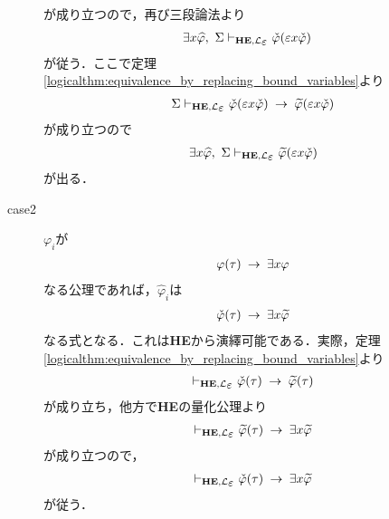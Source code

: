 \begin{metaprf}
\begin{description}
				が成り立つので，再び三段論法より
				\begin{align}
					\exists x \widehat{\varphi},\ \Sigma &\provable{\mbox{{\bf HE}},\lang{\varepsilon}} \check{\varphi}(\varepsilon x \check{\varphi})
				\end{align}
				が従う．ここで定理\ref{logicalthm:equivalence_by_replacing_bound_variables}より
				\begin{align}
					\Sigma \provable{\mbox{{\bf HE}},\lang{\varepsilon}} \check{\varphi}(\varepsilon x \check{\varphi}) \rarrow  \widetilde{\varphi}(\varepsilon x \check{\varphi})
				\end{align}
				が成り立つので
				\begin{align}
					\exists x \widehat{\varphi},\ \Sigma \provable{\mbox{{\bf HE}},\lang{\varepsilon}} \widetilde{\varphi}(\varepsilon x \check{\varphi})
				\end{align}
				が出る．
				
			\item[case2] $\varphi_{i}$が
				\begin{align}
					\varphi(\tau) \hspace{0.25em}\rightarrow\hspace{0.25em} \exists x \varphi
				\end{align}
				なる公理であれば，$\widehat{\varphi}_{i}$は
				\begin{align}
					\check{\varphi}(\tau) \hspace{0.25em}\rightarrow\hspace{0.25em} \exists x \widetilde{\varphi}
				\end{align}
				なる式となる．これは{\bf HE}から演繹可能である．実際，定理\ref{logicalthm:equivalence_by_replacing_bound_variables}より
				\begin{align}
					\provable{\mbox{{\bf HE}},\lang{\varepsilon}} \check{\varphi}(\tau) \rarrow \widetilde{\varphi}(\tau)
				\end{align}
				が成り立ち，他方で{\bf HE}の量化公理より
				\begin{align}
					\provable{\mbox{{\bf HE}},\lang{\varepsilon}} \widetilde{\varphi}(\tau) \rarrow \exists x \widetilde{\varphi}
				\end{align}
				が成り立つので，
				\begin{align}
					\provable{\mbox{{\bf HE}},\lang{\varepsilon}} \check{\varphi}(\tau) \rarrow \exists x \widetilde{\varphi}
				\end{align}
				が従う．
				

\end{description}
\end{metaprf}
